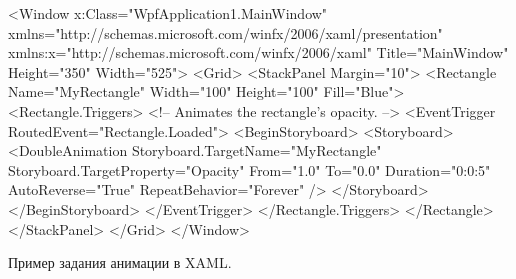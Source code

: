 \begin{listing}[H]
\begin{xmlcode}
<Window x:Class="WpfApplication1.MainWindow"
        xmlns="http://schemas.microsoft.com/winfx/2006/xaml/presentation"
        xmlns:x="http://schemas.microsoft.com/winfx/2006/xaml"
        Title="MainWindow" Height="350" Width="525">
    <Grid>
        <StackPanel Margin="10">
            <Rectangle
                Name="MyRectangle"
                Width="100" 
                Height="100"
                Fill="Blue">
                <Rectangle.Triggers>
                    <!-- Animates the rectangle's opacity. -->
                    <EventTrigger RoutedEvent="Rectangle.Loaded">
                        <BeginStoryboard>
                            <Storyboard>
                                <DoubleAnimation
                                    Storyboard.TargetName="MyRectangle" 
                                    Storyboard.TargetProperty="Opacity"
                                    From="1.0" To="0.0" Duration="0:0:5" 
                                    AutoReverse="True" RepeatBehavior="Forever" />
                            </Storyboard>
                        </BeginStoryboard>
                    </EventTrigger>
                </Rectangle.Triggers>
            </Rectangle>
        </StackPanel>
    </Grid>
</Window>
\end{xmlcode}
\caption{Пример задания анимации в XAML.}
\label{lst:animations_in_xaml}
\end{listing}

